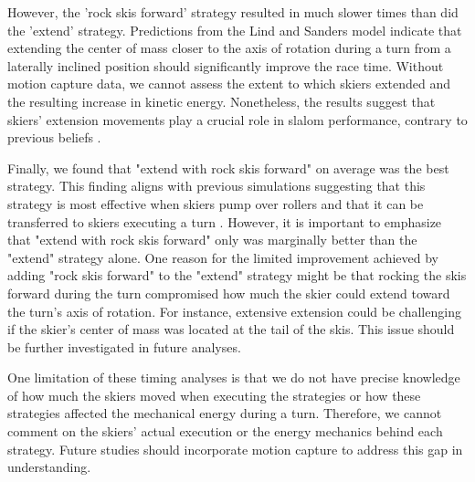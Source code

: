 However, the 'rock skis forward' strategy resulted in much slower times than did the 'extend' strategy. Predictions from the Lind and Sanders model \cite{lind_physics_2004} indicate that extending the center of mass closer to the axis of rotation during a turn from a laterally inclined position should significantly improve the race time. Without motion capture data, we cannot assess the extent to which skiers extended and the resulting increase in kinetic energy. Nonetheless, the results suggest that skiers' extension movements play a crucial role in slalom performance, contrary to previous beliefs \cite{supej_differential_2008, supej_doba_2001}.

Finally, we found that "extend with rock skis forward" on average was the best strategy. This finding aligns with previous simulations suggesting that this strategy is most effective when skiers pump over rollers \cite{mote_accelerations_1983} and that it can be transferred to skiers executing a turn \cite{reid_kinematic_2010}. However, it is important to emphasize that "extend with rock skis forward" only was marginally better than the "extend" strategy alone. One reason for the limited improvement achieved by adding "rock skis forward" to the "extend" strategy might be that rocking the skis forward during the turn compromised how much the skier could extend toward the turn's axis of rotation. For instance, extensive extension could be challenging if the skier's center of mass was located at the tail of the skis. This issue should be further investigated in future analyses.

One limitation of these timing analyses is that we do not have precise knowledge of how much the skiers moved when executing the strategies or how these strategies affected the mechanical energy during a turn. Therefore, we cannot comment on the skiers' actual execution or the energy mechanics behind each strategy. Future studies should incorporate motion capture to address this gap in understanding.


